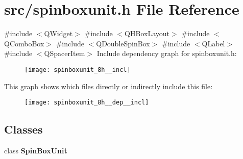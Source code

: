 \section{src/spinboxunit.h File Reference}
\label{spinboxunit_8h}
{\ttfamily \#include $<$Q\+Widget$>$}\newline
{\ttfamily \#include $<$Q\+H\+Box\+Layout$>$}\newline
{\ttfamily \#include $<$Q\+Combo\+Box$>$}\newline
{\ttfamily \#include $<$Q\+Double\+Spin\+Box$>$}\newline
{\ttfamily \#include $<$Q\+Label$>$}\newline
{\ttfamily \#include $<$Q\+Spacer\+Item$>$}\newline
Include dependency graph for spinboxunit.\+h\+:\nopagebreak
\begin{figure}[H]
\begin{center}
\leavevmode
\texttt{[image: spinboxunit\_8h\_\_incl]}
\end{center}
\end{figure}
This graph shows which files directly or indirectly include this file\+:\nopagebreak
\begin{figure}[H]
\begin{center}
\leavevmode
\texttt{[image: spinboxunit\_8h\_\_dep\_\_incl]}
\end{center}
\end{figure}
\subsection*{Classes}
\begin{DoxyCompactItemize}
\item 
class \textbf{ Spin\+Box\+Unit}
\end{DoxyCompactItemize}
